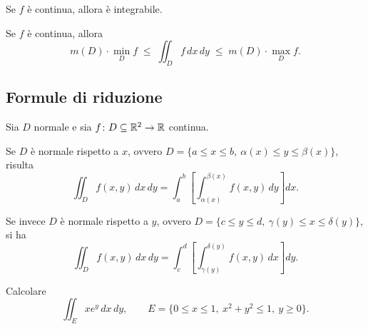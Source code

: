 \begin{theorem*}
    Se $f$ è continua, allora è integrabile.
\end{theorem*}

\begin{prop*}
    Se $f$ è continua, allora
    \[
        m(D) \cdot \min_D f \;\le\; \iint_D f \,dx\,dy \;\le\; m(D) \cdot \max_D f .
    \]
\end{prop*}

\subsection{Formule di riduzione}

\begin{theorem*}
    Sia $D$ normale e sia $f \colon D \subseteq \mathbb{R}^2 \rightarrow \mathbb{R}$ continua.

    Se $D$ è normale rispetto a $x$, ovvero $D = \{ a \le x \le b,\ \alpha(x) \le y \le \beta(x) \}$, risulta
    \[
        \iint_D f(x,y) \,dx\,dy = \int_a^b \left[ \int_{\alpha(x)}^{\beta(x)} f(x,y) \,dy \right] dx .
    \]

    Se invece $D$ è normale rispetto a $y$, ovvero $D = \{ c \le y \le d,\ \gamma(y) \le x \le \delta(y) \}$, si ha
    \[
        \iint_D f(x,y) \,dx\,dy = \int_c^d \left[ \int_{\gamma(y)}^{\delta(y)} f(x,y) \,dx \right] dy .
    \]
\end{theorem*}


\begin{esercizio}
    Calcolare
    \[
        \iint_E x e^y \,dx\,dy, \qquad E = \{ 0 \le x \le 1,\ x^2 + y^2 \le 1,\ y \ge 0 \}.
    \]
\end{esercizio}

